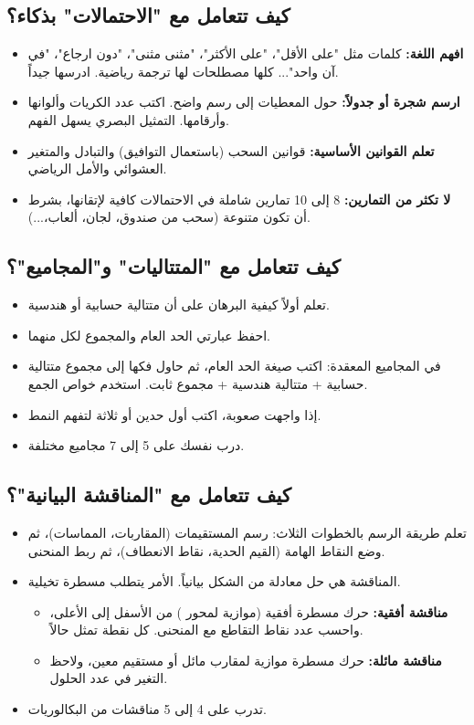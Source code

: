 \documentclass[12pt,a4paper]{book}
\begin{document}
	\subsection{كيف تتعامل مع "الاحتمالات" بذكاء؟}
	\begin{itemize}
		\item \textbf{افهم اللغة:} كلمات مثل "على الأقل"، "على الأكثر"، "مثنى مثنى"، "دون ارجاع"، "في آن واحد"... كلها مصطلحات لها ترجمة رياضية. ادرسها جيداً.
		\item \textbf{ارسم شجرة أو جدولاً:} حول المعطيات إلى رسم واضح. اكتب عدد الكريات وألوانها وأرقامها. التمثيل البصري يسهل الفهم.
		\item \textbf{تعلم القوانين الأساسية:} قوانين السحب (باستعمال التوافيق) والتبادل والمتغير العشوائي والأمل الرياضي.
		\item \textbf{لا تكثر من التمارين:} 8 إلى 10 تمارين شاملة في الاحتمالات كافية لإتقانها، بشرط أن تكون متنوعة (سحب من صندوق، لجان، ألعاب،...).
	\end{itemize}
	
	\subsection{كيف تتعامل مع "المتتاليات" و"المجاميع"؟}
	\begin{itemize}
		\item تعلم أولاً كيفية البرهان على أن متتالية حسابية أو هندسية.
		\item احفظ عبارتي الحد العام والمجموع لكل منهما.
		\item في المجاميع المعقدة: اكتب صيغة الحد العام، ثم حاول فكها إلى مجموع متتالية حسابية + متتالية هندسية + مجموع ثابت. استخدم خواص الجمع.
		\item إذا واجهت صعوبة، اكتب أول حدين أو ثلاثة لتفهم النمط.
		\item درب نفسك على 5 إلى 7 مجاميع مختلفة.
	\end{itemize}
	
	\subsection{كيف تتعامل مع "المناقشة البيانية"؟}
	\begin{itemize}
		\item تعلم طريقة الرسم بالخطوات الثلاث: رسم المستقيمات (المقاربات، المماسات)، ثم وضع النقاط الهامة (القيم الحدية، نقاط الانعطاف)، ثم ربط المنحنى.
		\item المناقشة هي حل معادلة من الشكل  بيانياً. الأمر يتطلب مسطرة تخيلية.
		\begin{itemize}
			\item \textbf{مناقشة أفقية:} حرك مسطرة أفقية (موازية لمحور ) من الأسفل إلى الأعلى، واحسب عدد نقاط التقاطع مع المنحنى. كل نقطة تمثل حالاً.
			\item \textbf{مناقشة مائلة:} حرك مسطرة موازية لمقارب مائل أو مستقيم معين، ولاحظ التغير في عدد الحلول.
		\end{itemize}
		\item تدرب على 4 إلى 5 مناقشات من البكالوريات.
	\end{itemize}
	
\end{document}
